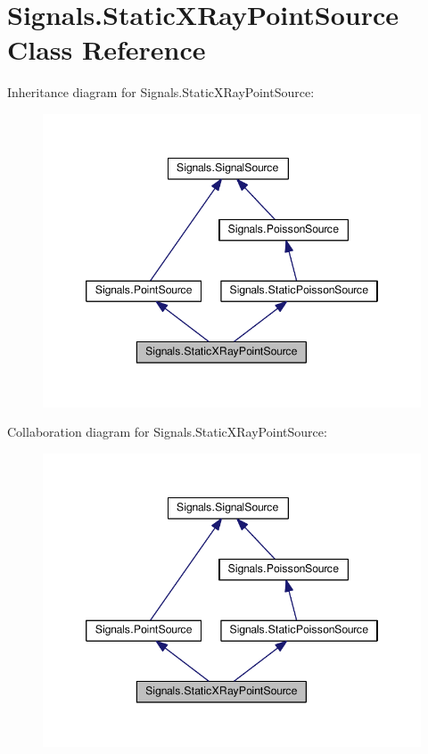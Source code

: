 \hypertarget{classSignals_1_1StaticXRayPointSource}{}\section{Signals.\+Static\+X\+Ray\+Point\+Source Class Reference}
\label{classSignals_1_1StaticXRayPointSource}


Inheritance diagram for Signals.\+Static\+X\+Ray\+Point\+Source\+:\nopagebreak
\begin{figure}[H]
\begin{center}
\leavevmode
\includegraphics[width=346pt]{classSignals_1_1StaticXRayPointSource__inherit__graph}
\end{center}
\end{figure}


Collaboration diagram for Signals.\+Static\+X\+Ray\+Point\+Source\+:\nopagebreak
\begin{figure}[H]
\begin{center}
\leavevmode
\includegraphics[width=346pt]{classSignals_1_1StaticXRayPointSource__coll__graph}
\end{center}
\end{figure}
